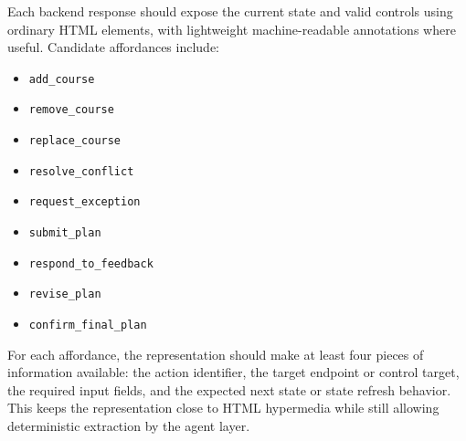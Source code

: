 Each backend response should expose the current state and valid controls using ordinary HTML elements, with lightweight machine-readable annotations where useful. Candidate affordances include:

\begin{itemize}
    \item \texttt{add\_course}
    \item \texttt{remove\_course}
    \item \texttt{replace\_course}
    \item \texttt{resolve\_conflict}
    \item \texttt{request\_exception}
    \item \texttt{submit\_plan}
    \item \texttt{respond\_to\_feedback}
    \item \texttt{revise\_plan}
    \item \texttt{confirm\_final\_plan}
\end{itemize}

For each affordance, the representation should make at least four pieces of information available: the action identifier, the target endpoint or control target, the required input fields, and the expected next state or state refresh behavior. This keeps the representation close to HTML hypermedia while still allowing deterministic extraction by the agent layer.